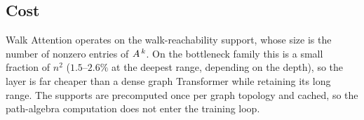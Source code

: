 \subsection{Cost}

Walk Attention operates on the walk-reachability support, whose size is the
number of nonzero entries of $A^{\,k}$. On the bottleneck family this is a
small fraction of $n^2$ ($1.5$--$2.6\%$ at the deepest range, depending on the
depth), so the layer is far
cheaper than a dense graph Transformer while retaining its long range. The
supports are precomputed once per graph topology and cached, so the path-algebra
computation does not enter the training loop.

